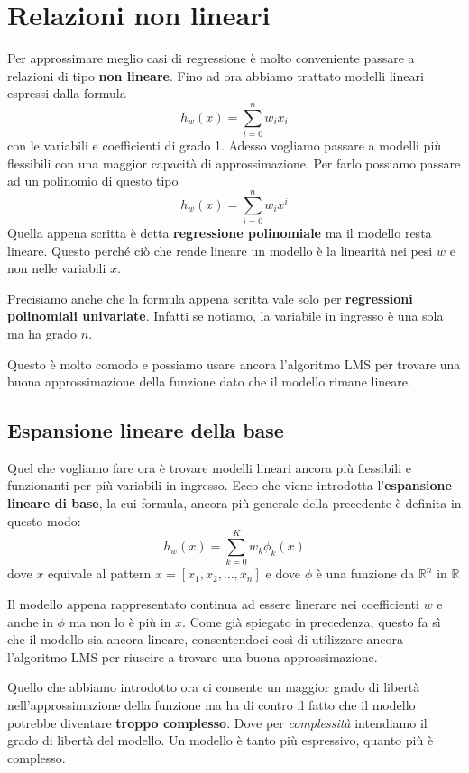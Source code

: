 \chapter{Relazioni non lineari}
Per approssimare meglio casi di regressione \`e molto conveniente passare a relazioni di tipo \textbf{non lineare}.
Fino ad ora abbiamo trattato modelli lineari espressi dalla formula
\[ h_w(x) = \sum_{i = 0}^n w_i x_i \]
con le variabili e coefficienti di grado 1. Adesso vogliamo passare a modelli pi\`u flessibili con una maggior
capacit\`a di approssimazione. Per farlo possiamo passare ad un polinomio di questo tipo
\[ h_w(x) = \sum_{i = 0}^n w_i x^i \]
Quella appena scritta \`e detta \textbf{regressione polinomiale} ma il modello resta lineare. Questo perch\'e ci\`o che
rende lineare un modello \`e la linearit\`a nei pesi $w$ e non nelle variabili $x$.

Precisiamo anche che la formula appena scritta vale solo per \textbf{regressioni polinomiali univariate}. Infatti se
notiamo, la variabile in ingresso \`e una sola ma ha grado $n$.

Questo \`e molto comodo e possiamo usare ancora l'algoritmo LMS per trovare una buona approssimazione della funzione
dato che il modello rimane lineare.

\section{Espansione lineare della base}
Quel che vogliamo fare ora \`e trovare modelli lineari ancora pi\`u flessibili e funzionanti per pi\`u variabili in
ingresso. Ecco che viene introdotta l'\textbf{espansione lineare di base}, la cui formula, ancora pi\`u generale della
precedente  \`e definita in questo modo:
\[ h_w(x) = \sum_{k = 0}^K w_k \phi_k(x) \]
dove $x$ equivale al pattern $x = [x_1, x_2, \dots, x_n]$ e dove $\phi$ \`e una funzione da
$\mathbb{R}^n$ in $\mathbb{R}$

Il modello appena rappresentato continua ad essere linerare nei coefficienti $w$ e anche in $\phi$ ma non lo \`e pi\`u
in $x$. Come gi\`a spiegato in precedenza, questo fa s\`i che il modello sia ancora lineare, consentendoci cos\`i di
utilizzare ancora l'algoritmo LMS per riuscire a trovare una buona approssimazione.

Quello che abbiamo introdotto ora ci consente un maggior grado di libert\`a nell'approssimazione della funzione ma ha
di contro il fatto che il modello potrebbe diventare \textbf{troppo complesso}. Dove per \emph{complessit\`a} intendiamo
il grado di libert\`a del modello. Un modello \`e tanto pi\`u espressivo, quanto pi\`u \`e complesso.

